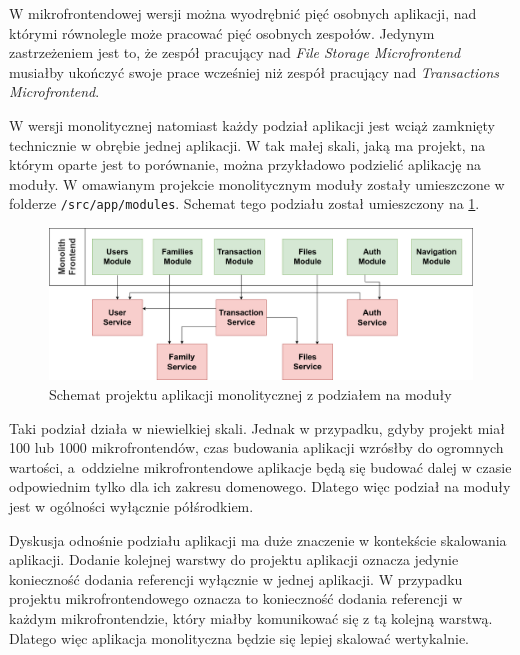 \documentclass{SGGW-thesis}
\begin{document}
{  W mikrofrontendowej wersji można wyodrębnić pięć osobnych aplikacji, nad którymi równolegle może pracować pięć osobnych zespołów. Jedynym zastrzeżeniem jest to, że 
  zespół pracujący nad \textit{File Storage Microfrontend} musiałby ukończyć swoje prace wcześniej niż zespół pracujący nad \textit{Transactions Microfrontend}.

  W wersji monolitycznej natomiast każdy podział aplikacji jest wciąż zamknięty technicznie w obrębie jednej aplikacji. W tak małej skali, jaką ma projekt, na którym oparte jest to porównanie, można przykładowo podzielić aplikację na moduły. W omawianym projekcie monolitycznym moduły zostały umieszczone w folderze \lstinline{/src/app/modules}. Schemat tego podziału został umieszczony na \cref{fig:monolith_fe_modules_diagram}.

  \begin{figure}[h]
    \centering
    \captionsetup{justification=centering}
    \includegraphics[width=\textwidth]{mfe-modules.png}
    \caption{Schemat projektu aplikacji monolitycznej z podziałem na moduły}
    \label{fig:monolith_fe_modules_diagram}
  \end{figure}

  Taki podział działa w niewielkiej skali. Jednak w przypadku, gdyby projekt miał 100 lub 1000 mikrofrontendów, czas budowania aplikacji wzrósłby do ogromnych wartości, a~oddzielne mikrofrontendowe aplikacje będą się budować dalej w czasie odpowiednim tylko dla ich zakresu domenowego. Dlatego więc podział na moduły jest w ogólności wyłącznie półśrodkiem.

  Dyskusja odnośnie podziału aplikacji ma duże znaczenie w kontekście skalowania aplikacji. Dodanie kolejnej warstwy do projektu aplikacji oznacza jedynie konieczność dodania referencji wyłącznie w jednej aplikacji. W przypadku projektu mikrofrontendowego oznacza to konieczność dodania referencji w każdym mikrofrontendzie, który miałby komunikować się z tą kolejną warstwą. Dlatego więc aplikacja monolityczna będzie się lepiej skalować wertykalnie.

}
\end{document}
